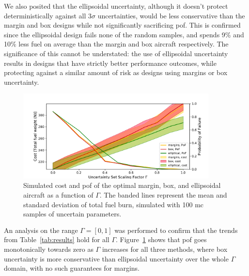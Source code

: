 We also posited that the ellipsoidal uncertainty, although it doesn't
protect deterministically against all $3\sigma$ uncertainties, would be less conservative than the
margin and box designs while not significantly sacrificing \gls{pof}. This is
confirmed since the ellipsoidal design fails none of the random samples,
and spends 9\% and 10\% less fuel on average
than the margin and box aircraft respectively.
The significance of this cannot be understated: the use of ellipsoidal uncertainty
results in designs that have strictly better performance outcomes, while protecting
against a similar amount of risk as designs using margins or box uncertainty.

\begin{figure}[ht]
    \centering
    \captionsetup{justification=centering, font=small}
    \includegraphics[width=0.9\textwidth]{pof_and_cost.pdf}
    \caption{Simulated cost and \gls{pof} of the optimal margin, box, and ellipsoidal aircraft
    as a function of $\Gamma$.
    The banded lines represent the mean and standard deviation of total fuel burn,
    simulated with 100 \gls{mc} samples of uncertain parameters.}
    \label{fig:probOfFailure}
\end{figure}

An analysis on the range $\Gamma=[0,1]$ was performed to confirm that the trends from
Table~\ref{tab:results} hold for all $\Gamma$. Figure~\ref{fig:probOfFailure}
shows that \gls{pof} goes monotonically
towards zero as $\Gamma$ increases for all three methods, where box uncertainty is
more conservative than ellipsoidal uncertainty over the whole $\Gamma$ domain, with no
such guarantees for margins.

